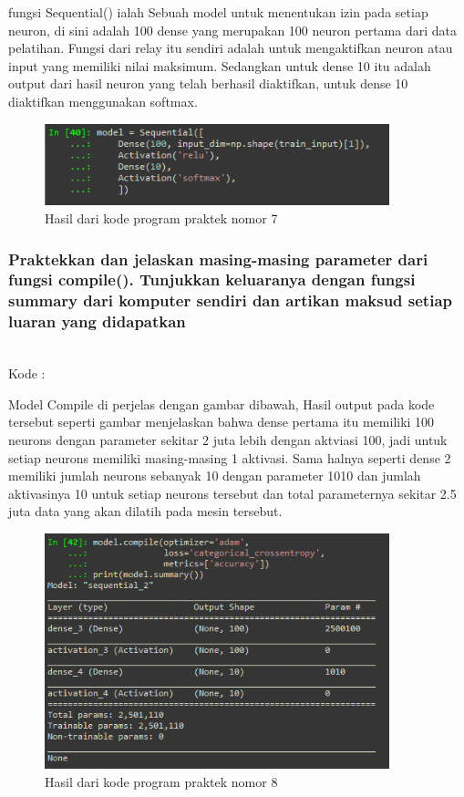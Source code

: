 fungsi Sequential() ialah Sebuah model untuk menentukan izin pada setiap neuron, di sini adalah 100 dense yang merupakan 100 neuron pertama dari data pelatihan. Fungsi dari relay itu sendiri adalah untuk mengaktifkan neuron atau input yang memiliki nilai maksimum. Sedangkan untuk dense 10 itu adalah output dari hasil neuron yang telah berhasil diaktifkan, untuk dense 10 diaktifkan menggunakan softmax.
\begin{figure}[H]
	\centering
	\includegraphics[width=10cm]{figures/1174083/figures6/35.png}			
	\caption{Hasil dari kode program praktek nomor 7}
\end{figure}

\subsubsection{Praktekkan dan jelaskan masing-masing parameter dari fungsi compile(). Tunjukkan keluaranya dengan fungsi summary dari komputer sendiri dan artikan maksud setiap luaran yang didapatkan}
\hfill\\
Kode :


Model Compile di perjelas dengan gambar dibawah, Hasil output pada kode tersebut seperti gambar menjelaskan bahwa dense pertama itu memiliki 100 neurons dengan parameter sekitar 2 juta lebih dengan aktviasi 100, jadi untuk setiap neurons memiliki masing-masing 1 aktivasi. Sama halnya seperti dense 2 memiliki jumlah neurons sebanyak 10 dengan parameter 1010 dan jumlah aktivasinya 10 untuk setiap neurons tersebut dan total parameternya sekitar 2.5 juta data yang akan dilatih pada mesin tersebut.
\begin{figure}[H]
	\centering
	\includegraphics[width=10cm]{figures/1174083/figures6/36.png}			
	\caption{Hasil dari kode program praktek nomor 8}
\end{figure}

